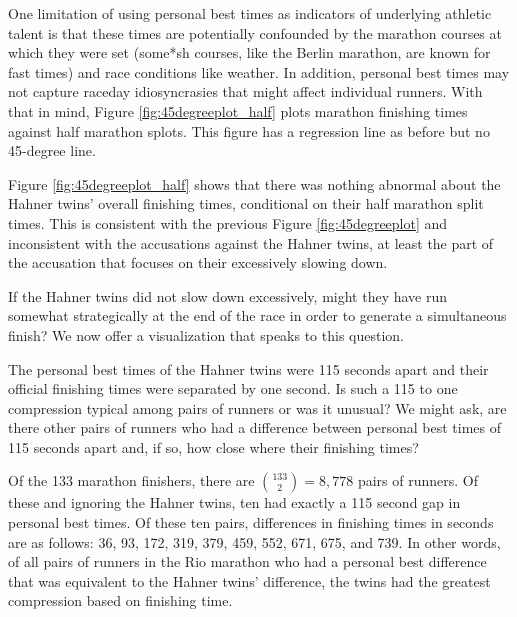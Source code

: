 \documentclass[12pt,titlepage]{article}
\begin{document}
One limitation of using personal best times as indicators of
underlying athletic talent is that these times are potentially
confounded by the marathon courses at which they were set (some*sh
courses, like the Berlin marathon, are known for fast times) and race
conditions like weather.  In addition, personal best times may not
capture raceday idiosyncrasies that might affect individual runners.
With that in mind, Figure \ref{fig:45degreeplot_half} plots marathon
finishing times against half marathon splots.  This figure has a
regression line as before but no 45-degree line.

Figure \ref{fig:45degreeplot_half} shows that there was nothing
abnormal about the Hahner twins' overall finishing times, conditional
on their half marathon split times.  This is consistent with the
previous Figure \ref{fig:45degreeplot} and inconsistent with the
accusations against the Hahner twins, at least the part of the
accusation that focuses on their excessively slowing down.

If the Hahner twins did not slow down excessively, might they have
run somewhat strategically at the end of the race in order to generate
a simultaneous finish?  We now offer a visualization that speaks to
this question.

The personal best times of the Hahner twins were 115 seconds apart and
their official finishing times were separated by one second.  Is such
a 115 to one compression typical among pairs of runners or was it
unusual?  We might ask, are there other pairs of runners who had a
difference between personal best times of 115 seconds apart and, if
so, how close where their finishing times?

Of the 133 marathon finishers, there are $\binom{133}{2} = 8,778$
pairs of runners.  Of these and ignoring the Hahner twins, ten had
exactly a 115 second gap in personal best times.  Of these ten pairs,
differences in finishing times in seconds are as follows: 36, 93, 172,
319, 379, 459, 552, 671, 675, and 739.  In other words, of all pairs
of runners in the Rio marathon who had a personal best difference that
was equivalent to the Hahner twins' difference, the twins had the
greatest compression based on finishing time.
\end{document}
